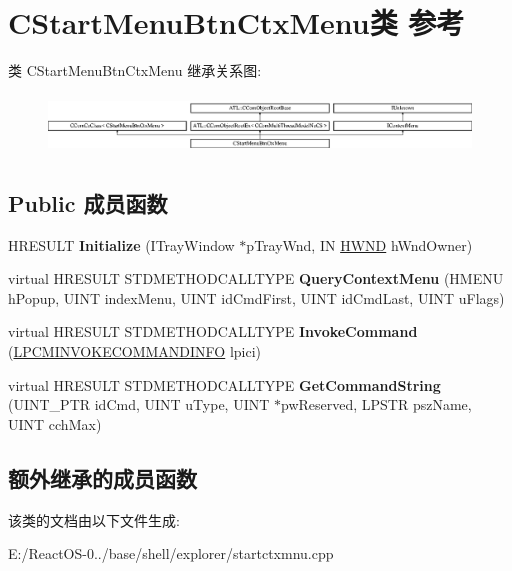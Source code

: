 \hypertarget{class_c_start_menu_btn_ctx_menu}{}\section{C\+Start\+Menu\+Btn\+Ctx\+Menu类 参考}
\label{class_c_start_menu_btn_ctx_menu}
类 C\+Start\+Menu\+Btn\+Ctx\+Menu 继承关系图\+:\begin{figure}[H]
\begin{center}
\leavevmode
\includegraphics[height=1.590909cm]{class_c_start_menu_btn_ctx_menu}
\end{center}
\end{figure}
\subsection*{Public 成员函数}
\begin{DoxyCompactItemize}
\item 
\mbox{\label{class_c_start_menu_btn_ctx_menu_aa199aaf5b66271ef16f768fc2ae27ba0}} 
H\+R\+E\+S\+U\+LT {\bfseries Initialize} (I\+Tray\+Window $\ast$p\+Tray\+Wnd, IN \hyperlink{interfacevoid}{H\+W\+ND} h\+Wnd\+Owner)
\item 
\mbox{\label{class_c_start_menu_btn_ctx_menu_ab8b6a898c93926c6fdcc41a676207897}} 
virtual H\+R\+E\+S\+U\+LT S\+T\+D\+M\+E\+T\+H\+O\+D\+C\+A\+L\+L\+T\+Y\+PE {\bfseries Query\+Context\+Menu} (H\+M\+E\+NU h\+Popup, U\+I\+NT index\+Menu, U\+I\+NT id\+Cmd\+First, U\+I\+NT id\+Cmd\+Last, U\+I\+NT u\+Flags)
\item 
\mbox{\label{class_c_start_menu_btn_ctx_menu_a348289a6c035189e8782e726ff70d78e}} 
virtual H\+R\+E\+S\+U\+LT S\+T\+D\+M\+E\+T\+H\+O\+D\+C\+A\+L\+L\+T\+Y\+PE {\bfseries Invoke\+Command} (\hyperlink{struct_i_context_menu_1_1tag_c_m_i_n_v_o_k_e_c_o_m_m_a_n_d_i_n_f_o}{L\+P\+C\+M\+I\+N\+V\+O\+K\+E\+C\+O\+M\+M\+A\+N\+D\+I\+N\+FO} lpici)
\item 
\mbox{\label{class_c_start_menu_btn_ctx_menu_a773d9ee69ee5c9bb79d2b208235ce60a}} 
virtual H\+R\+E\+S\+U\+LT S\+T\+D\+M\+E\+T\+H\+O\+D\+C\+A\+L\+L\+T\+Y\+PE {\bfseries Get\+Command\+String} (U\+I\+N\+T\+\_\+\+P\+TR id\+Cmd, U\+I\+NT u\+Type, U\+I\+NT $\ast$pw\+Reserved, L\+P\+S\+TR psz\+Name, U\+I\+NT cch\+Max)
\end{DoxyCompactItemize}
\subsection*{额外继承的成员函数}


该类的文档由以下文件生成\+:\begin{DoxyCompactItemize}
\item 
E\+:/\+React\+O\+S-\/0../base/shell/explorer/startctxmnu.\+cpp\end{DoxyCompactItemize}
